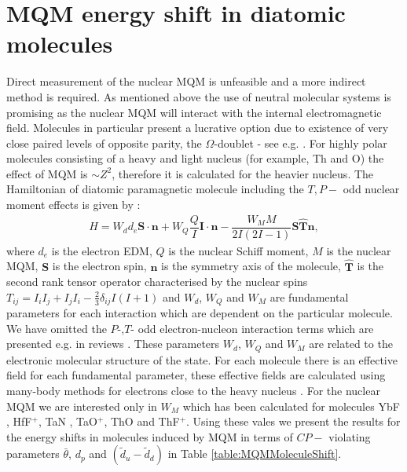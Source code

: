 \documentclass[8pt,a4paper, twoside]{report}
\begin{document}
\section{MQM energy shift in diatomic molecules} \label{sec:MQMmolecule}
Direct measurement of the nuclear MQM is unfeasible and a more indirect method is required. As mentioned above the use of neutral molecular systems is promising as the nuclear MQM will interact with the internal electromagnetic field. Molecules in particular present a lucrative option due to existence of very close paired levels of opposite parity, the  $\Omega$-doublet - see e.g.  \cite{Flambaum2014}. For highly polar molecules consisting of a heavy and light nucleus (for example, Th and O) the effect of MQM is $\sim Z^2$, therefore it is calculated for the heavier nucleus. The Hamiltonian of diatomic paramagnetic molecule including the $T, P-$ odd nuclear moment effects is given by \cite{SFK1984,Kozlov1995}:
\begin{align}
H = W_d d_e \mathbf{S}\cdot\mathbf{n} + W_{Q}\dfrac{Q}{I}\mathbf{I}\cdot\mathbf{n} - \dfrac{W_{M}M}{2I(2I -1)}\mathbf{S}\hat{\mathbf{T}}\mathbf{n},
\end{align}
where $d_e$ is the electron EDM, $Q$ is the nuclear Schiff moment, $M$ is the nuclear MQM, $\mathbf{S}$ is the electron spin, $\mathbf{n}$ is the symmetry axis of the molecule, $\hat{\mathbf{T}} $ is the second rank tensor operator characterised by the nuclear spins $T_{ij} = I_iI_j + I_jI_i - \tfrac{2}{3}\delta_{ij}I(I + 1)$  and  $W_d$, $W_Q$ and $W_M$ are fundamental parameters for each interaction which are dependent on the particular molecule. We have omitted the $P$-,$T$- odd electron-nucleon interaction terms which are presented e.g. in reviews \cite{Safronova2017,GF2004}. 
These parameters $W_d$, $W_Q$ and $W_M$
are related to the electronic molecular structure of the state. For each molecule there is an effective field for each fundamental parameter, these effective fields are calculated using many-body methods for electrons close to the heavy nucleus \cite{Flambaum2014}.  For the nuclear MQM we are interested only in $W_M$ which has been calculated for molecules YbF \cite{Kozlov1995}, HfF$^{+}$\cite{Skripnikov2017}, TaN \cite{Skripnikov2015Ta, Fleig2016TaN}, TaO$^+$\cite{Fleig2018}, ThO \cite{Skripnikov2014ThO} and ThF$^+$\cite{Skripnikov2015Th}. 
Using these vales we present the results for the energy shifts in molecules induced by MQM in terms of $CP-$ violating parameters $\bar{\theta}$, $d_p$  and $(\tilde{d}_u -\tilde{d}_d)$ in Table \ref{table:MQMMoleculeShift}. 
\end{document}
